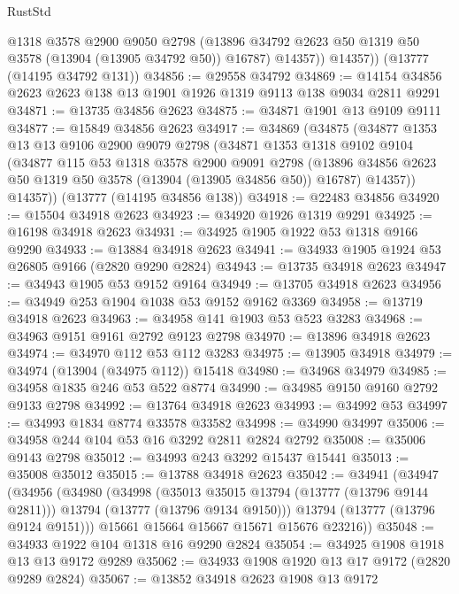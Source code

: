 \begin{lexlean}{RustStd}
\begin{coremodule}
            @1318
            @3578
            @2900
            @9050
            @2798
            (@13896 @34792 @2623 @50 @1319 @50 @3578 (@13904 (@13905 @34792 @50)) @16787)
            @14357))
        @14357))
    (@13777 (@14195 @34792 @131))
@34856 := @29558 @34792
@34869 := @14154 @34856 @2623 @2623 @138 @13 @1901 @1926 @1319 @9113 @138 @9034 @2811 @9291
@34871 := @13735 @34856 @2623
@34875 := @34871 @1901 @13 @9109 @9111
@34877 := @15849 @34856 @2623
@34917 := @34869
    (@34875
      (@34877
        @1353
        @13
        @13
        @9106
        @2900
        @9079
        @2798
        (@34871
          @1353
          @1318
          @9102
          @9104
          (@34877
            @115
            @53
            @1318
            @3578
            @2900
            @9091
            @2798
            (@13896 @34856 @2623 @50 @1319 @50 @3578 (@13904 (@13905 @34856 @50)) @16787)
            @14357))
        @14357))
    (@13777 (@14195 @34856 @138))
@34918 := @22483 @34856
@34920 := @15504 @34918 @2623
@34923 := @34920 @1926 @1319 @9291
@34925 := @16198 @34918 @2623
@34931 := @34925 @1905 @1922 @53 @1318 @9166 @9290
@34933 := @13884 @34918 @2623
@34941 := @34933 @1905 @1924 @53 @26805 @9166 (@2820 @9290 @2824)
@34943 := @13735 @34918 @2623
@34947 := @34943 @1905 @53 @9152 @9164
@34949 := @13705 @34918 @2623
@34956 := @34949 @253 @1904 @1038 @53 @9152 @9162 @3369
@34958 := @13719 @34918 @2623
@34963 := @34958 @141 @1903 @53 @523 @3283
@34968 := @34963 @9151 @9161 @2792 @9123 @2798
@34970 := @13896 @34918 @2623
@34974 := @34970 @112 @53 @112 @3283
@34975 := @13905 @34918
@34979 := @34974 (@13904 (@34975 @112)) @15418
@34980 := @34968 @34979
@34985 := @34958 @1835 @246 @53 @522 @8774
@34990 := @34985 @9150 @9160 @2792 @9133 @2798
@34992 := @13764 @34918 @2623
@34993 := @34992 @53
@34997 := @34993 @1834 @8774 @33578 @33582
@34998 := @34990 @34997
@35006 := @34958 @244 @104 @53 @16 @3292 @2811 @2824 @2792
@35008 := @35006 @9143 @2798
@35012 := @34993 @243 @3292 @15437 @15441
@35013 := @35008 @35012
@35015 := @13788 @34918 @2623
@35042 := @34941
    (@34947
      (@34956
        (@34980
          (@34998
            (@35013 @35015 @13794 (@13777 (@13796 @9144 @2811)))
            @13794
            (@13777 (@13796 @9134 @9150)))
          @13794
          (@13777 (@13796 @9124 @9151)))
        @15661
        @15664
        @15667
        @15671
        @15676
        @23216))
@35048 := @34933 @1922 @104 @1318 @16 @9290 @2824
@35054 := @34925 @1908 @1918 @13 @13 @9172 @9289
@35062 := @34933 @1908 @1920 @13 @17 @9172 (@2820 @9289 @2824)
@35067 := @13852 @34918 @2623 @1908 @13 @9172

\end{coremodule}
\end{lexlean}
